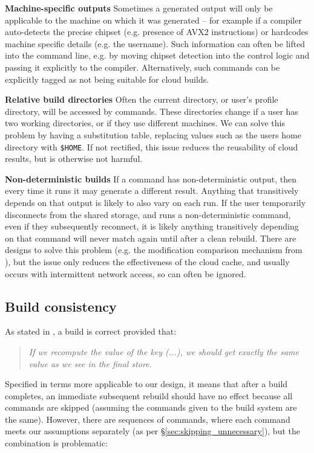\textbf{Machine-specific outputs} Sometimes a generated output will only be applicable to the machine on which it was generated -- for example if a compiler auto-detects the precise chipset (e.g. presence of AVX2 instructions) or hardcodes machine specific details (e.g. the username). Such information can often be lifted into the command line, e.g. by moving chipset detection into the control logic and passing it explicitly to the compiler. Alternatively, such commands can be explicitly tagged as not being suitable for cloud builds.

\textbf{Relative build directories} Often the current directory, or user's profile directory, will be accessed by commands. These directories change if a user has two working directories, or if they use different machines. We can solve this problem by having a substitution table, replacing values such as the users home directory with \texttt{\$HOME}. If not rectified, this issue reduces the reusability of cloud results, but is otherwise not harmful.

\textbf{Non-deterministic builds} If a command has non-deterministic output, then every time it runs it may generate a different result. Anything that transitively depends on that output is likely to also vary on each run. If the user temporarily disconnects from the shared storage, and runs a non-deterministic command, even if they subsequently reconnect, it is likely anything transitively depending on that command will never match again until after a clean rebuild. There are designs to solve this problem (e.g. the modification comparison mechanism from \citet{erdweg2015sound}), but the issue only reduces the effectiveness of the cloud cache, and usually occurs with intermittent network access, so can often be ignored.

\subsection{Build consistency}
\label{sec:hazards}

As stated in \citet[\S3.6]{build_systems_a_la_carte}, a build is correct provided that:

\begin{quote}
\emph{If we recompute the value of the key (...), we should get exactly the same value as we see in the final store.}
\end{quote}

Specified in terms more applicable to our design, it means that after a build completes, an immediate subsequent rebuild should have no effect because all commands are skipped (assuming the commands given to the build system are the same). However, there are sequences of commands, where each command meets our assumptions separately (as per \S\ref{sec:skipping_unnecessary}), but the combination is problematic:

